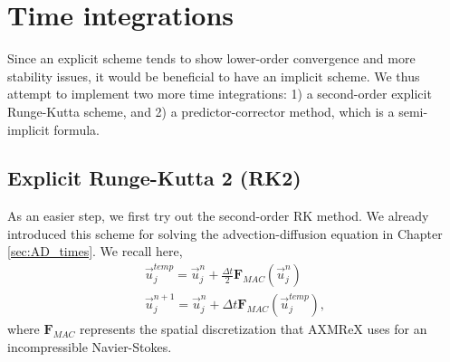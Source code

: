 \section{Time integrations}
Since an explicit scheme tends to show lower-order convergence and more stability issues, it would be beneficial to have an implicit scheme. We thus attempt to implement two more time integrations: 1) a second-order explicit Runge-Kutta scheme, and 2) a predictor-corrector method, which is a semi-implicit formula. 
\subsection{Explicit Runge-Kutta 2 (RK2)}
As an easier step, we first try out the second-order RK method. We already introduced this scheme for solving the advection-diffusion equation in Chapter \ref{sec:AD_times}. We recall here, 
\begin{align}
	\vec{u}_{j}^{temp} = \vec{u}_j^{n} + \frac{\Delta t}{2} {\bm F_{MAC}} \left( \vec{u}_j^{n} \right)
	\label{eq_RK2_s1} \\ 
	\vec{u}_j^{n+1} = \vec{u}_j^{n} + \Delta t {\bm F_{MAC}} \left( \vec{u}_j^{temp} \right),
	\label{eq_RK2_s2}
\end{align}
where ${\bm F_{MAC}}$ represents the spatial discretization that AXMReX uses for an incompressible Navier-Stokes. 


